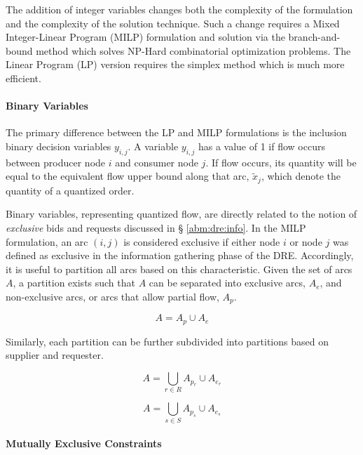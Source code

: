 The addition of integer variables changes both the complexity of the formulation
and the complexity of the solution technique. Such a change requires a Mixed
Integer-Linear Program (MILP) formulation and solution via the branch-and-bound
method which solves NP-Hard combinatorial optimization problems. The Linear
Program (LP) version requires the simplex method which is much more efficient.

\paragraph{Binary Variables}

The primary difference between the LP and MILP formulations is the inclusion
binary decision variables $y_{i,j}$. A variable $y_{i,j}$ has a value of 1 if
flow occurs between producer node $i$ and consumer node $j$. If flow occurs, its
quantity will be equal to the equivalent flow upper bound along that arc,
$\tilde{x}_{j}$, which denote the quantity of a quantized order.

Binary variables, representing quantized flow, are directly related to the
notion of \textit{exclusive} bids and requests discussed in \S
\ref{abm:dre:info}. In the MILP formulation, an arc $(i, j)$ is considered
exclusive if either node $i$ or node $j$ was defined as exclusive in the
information gathering phase of the DRE. Accordingly, it is useful to partition
all arcs based on this characteristic. Given the set of arcs $A$, a partition
exists such that $A$ can be separated into exclusive arcs, $A_e$, and
non-exclusive arcs, or arcs that allow partial flow, $A_p$.

\begin{equation}\label{eqs:arc-union}
  A = A_{p} \cup A_{e}
\end{equation}

Similarly, each partition can be further subdivided into partitions based on
supplier and requester. 

\begin{equation}\label{eqs:arc-union}
  A = \bigcup_{r \in R} A_{p_r} \cup A_{e_r}
\end{equation}

\begin{equation}\label{eqs:arc-union}
  A = \bigcup_{s \in S} A_{p_s} \cup A_{e_s}
\end{equation}

\paragraph{Mutually Exclusive Constraints}

